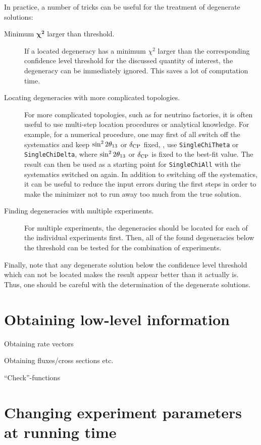 In practice, a number of tricks can be useful for the treatment of degenerate solutions:
\begin{description}
\item[Minimum $\boldsymbol{\chi^2}$ larger than threshold.] If a located degeneracy has a minimum $\chi^2$ larger than the corresponding confidence level threshold for the discussed quantity of interest, the degeneracy can be immediately ignored. This saves a lot of computation time.
\item[Locating degeneracies with more complicated topologies.] For more complicated topologies, such as for neutrino factories, it is often useful to use multi-step location procedures or analytical knowledge. For example, for a numerical procedure, one may first of all switch off the systematics and keep $\sin^2 2 \theta_{13}$ or $\delta_{\mathrm{CP}}$ fixed, \ie, use {\tt SingleChiTheta} or {\tt SingleChiDelta}, where $\sin^2 2 \theta_{13}$ or $\delta_{\mathrm{CP}}$ is fixed to the best-fit value. The result can then be used as a starting point for {\tt SingleChiAll} with the systematics switched on again. In addition to switching off the systematics, it can be useful to reduce the input errors during the first steps in order to make the minimizer not to run away too much from the true solution.
\item[Finding degeneracies with multiple experiments.] For multiple experiments, the degeneracies should be located for each of the individual experiments first. Then, all of the found degeneracies below the threshold can be tested for the combination of experiments.  
\end{description}
Finally, note that any degenerate solution below the confidence level threshold which can not be located makes the result appear better than it actually is. Thus, one should be careful with the determination of the degenerate solutions.

\chapter{Obtaining low-level information}

\bi
\item
 Obtaining rate vectors
\item
 Obtaining fluxes/cross sections etc.
\item
 ``Check''-functions
\ei

\chapter{Changing experiment parameters at running time}

